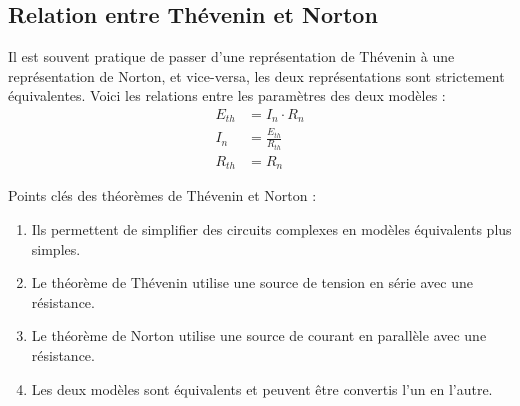 \subsection{Relation entre Thévenin et Norton}

Il est souvent pratique de passer d'une représentation de Thévenin à une
représentation de Norton, et vice-versa, les deux représentations sont
strictement équivalentes. Voici les relations entre les paramètres des deux
modèles :
\begin{align*}
  E_{th} & = I_{n} \cdot R_{n} \\
  I_{n} & = \frac{E_{th}}{R_{th}} \\
  R_{th} & = R_{n}
\end{align*}

\begin{Note}
	Points clés des théorèmes de Thévenin et Norton :
    \begin{enumerate}
        \item Ils permettent de simplifier des circuits complexes en modèles équivalents plus simples.
        \item Le théorème de Thévenin utilise une source de tension en série avec une résistance.
        \item Le théorème de Norton utilise une source de courant en parallèle avec une résistance.
        \item Les deux modèles sont équivalents et peuvent être convertis l’un en l’autre.
    \end{enumerate}
\end{Note}
